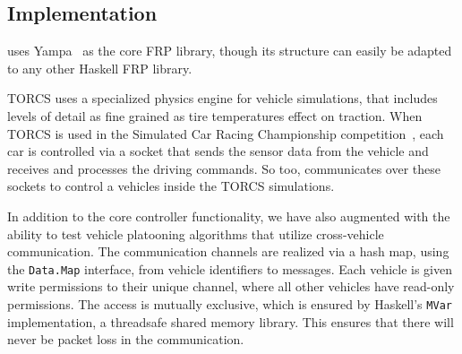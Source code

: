 \subsection{Implementation} 

\mbox{\ourLib} uses Yampa~\cite{courtney2003yampa} as the core FRP library, though its structure can easily be adapted to any other Haskell FRP library.

TORCS uses a specialized physics engine for vehicle simulations, that includes levels of detail as fine grained as tire temperatures effect on traction. 
When TORCS is used in the Simulated Car Racing Championship competition~\cite{SCRC}, each car is controlled via a socket that sends the sensor data from the vehicle and receives and processes the driving commands.
So too, \ourLib communicates over these sockets to control a vehicles inside the TORCS simulations.

In addition to the core controller functionality, we have also augmented \ourLib with the ability to test vehicle platooning algorithms that utilize cross-vehicle communication.
The communication channels are realized via a hash map, using the \texttt{Data.Map} interface, from vehicle identifiers to messages.
Each vehicle is given write permissions to their unique channel, where all other vehicles have read-only permissions.
The access is mutually exclusive, which is ensured by Haskell's \texttt{MVar} implementation, a threadsafe shared memory library.
This ensures that there will never be packet loss in the communication.
 
